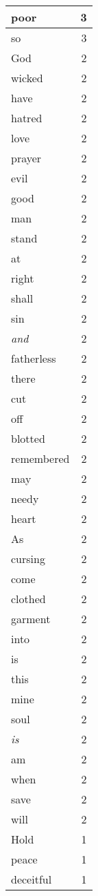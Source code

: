 \begin{center}
\begin{longtable}{l|r}
poor & 3 \\ \hline
so & 3 \\ \hline
God & 2 \\ \hline
wicked & 2 \\ \hline
have & 2 \\ \hline
hatred & 2 \\ \hline
love & 2 \\ \hline
prayer & 2 \\ \hline
evil & 2 \\ \hline
good & 2 \\ \hline
man & 2 \\ \hline
stand & 2 \\ \hline
at & 2 \\ \hline
right & 2 \\ \hline
shall & 2 \\ \hline
sin & 2 \\ \hline
\emph{and} & 2 \\ \hline
fatherless & 2 \\ \hline
there & 2 \\ \hline
cut & 2 \\ \hline
off & 2 \\ \hline
blotted & 2 \\ \hline
remembered & 2 \\ \hline
may & 2 \\ \hline
needy & 2 \\ \hline
heart & 2 \\ \hline
As & 2 \\ \hline
cursing & 2 \\ \hline
come & 2 \\ \hline
clothed & 2 \\ \hline
garment & 2 \\ \hline
into & 2 \\ \hline
is & 2 \\ \hline
this & 2 \\ \hline
mine & 2 \\ \hline
soul & 2 \\ \hline
\emph{is} & 2 \\ \hline
am & 2 \\ \hline
when & 2 \\ \hline
save & 2 \\ \hline
will & 2 \\ \hline
Hold & 1 \\ \hline
peace & 1 \\ \hline
deceitful & 1 \\ \hline

\end{longtable}
\end{center}
